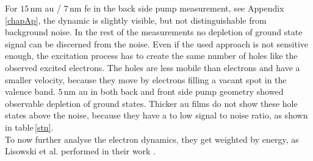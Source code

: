 \documentclass[a4paper,12pt,twoside]{article}
\begin{document}
  \noindent For $15\,\mathrm{nm}$ \gls{au} / $7\,\mathrm{nm}$ \gls{fe} in the back side pump measurement, see Appendix \ref{chapAp}, the dynamic is slightly visible, but not distinguishable from background noise. In the rest of the measurements no depletion of ground state signal can be discerned from the noise.
Even if the used approach is not sensitive enough, the excitation process has to create the same number of holes like the observed excited electrons. The holes are less mobile than electrons and have a smaller velocity, because they move by electrons filling a vacant spot in the valence band. $5\,\mathrm{\mbox{nm}}$ \gls{au} in both back and front side pump geometry showed observable depletion of ground states. Thicker \gls{au} films do not show these hole states above the noise, because they have a to low signal to noise ratio, as shown in table\,\ref{stn}.
\\
To now further analyse the electron dynamics, they get weighted by energy, as Lisowski et al. performed in their work \cite{Lisowski}.
\end{document}
